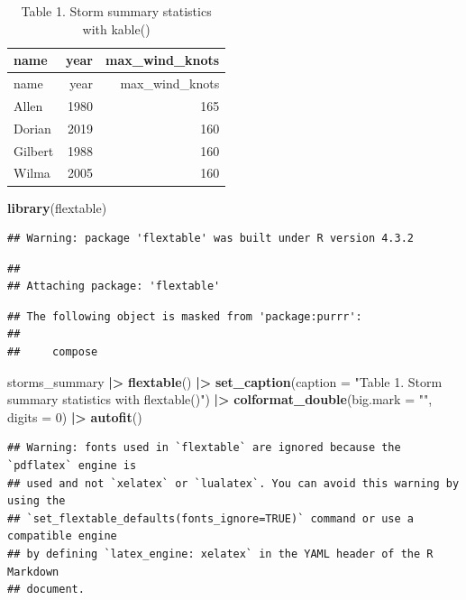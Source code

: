 \documentclass[
]{article}
\newenvironment{Shaded}{\begin{snugshade}}{\end{snugshade}}
\newcommand{\AttributeTok}[1]{\textcolor[rgb]{0.13,0.29,0.53}{#1}}
\newcommand{\DecValTok}[1]{\textcolor[rgb]{0.00,0.00,0.81}{#1}}
\newcommand{\FunctionTok}[1]{\textcolor[rgb]{0.13,0.29,0.53}{\textbf{#1}}}
\newcommand{\NormalTok}[1]{#1}
\newcommand{\SpecialCharTok}[1]{\textcolor[rgb]{0.81,0.36,0.00}{\textbf{#1}}}
\newcommand{\StringTok}[1]{\textcolor[rgb]{0.31,0.60,0.02}{#1}}
\begin{document}
\begin{longtable}[]{@{}lrr@{}}
\caption{Table 1. Storm summary statistics with kable()}\tabularnewline
\toprule\noalign{}
name & year & max\_wind\_knots \\
\midrule\noalign{}
\endfirsthead
\toprule\noalign{}
name & year & max\_wind\_knots \\
\midrule\noalign{}
\endhead
\bottomrule\noalign{}
\endlastfoot
Allen & 1980 & 165 \\
Dorian & 2019 & 160 \\
Gilbert & 1988 & 160 \\
Wilma & 2005 & 160 \\
\end{longtable}

\begin{Shaded}
\begin{Highlighting}[]
\FunctionTok{library}\NormalTok{(flextable)}
\end{Highlighting}
\end{Shaded}

\begin{verbatim}
## Warning: package 'flextable' was built under R version 4.3.2
\end{verbatim}

\begin{verbatim}
## 
## Attaching package: 'flextable'
\end{verbatim}

\begin{verbatim}
## The following object is masked from 'package:purrr':
## 
##     compose
\end{verbatim}

\begin{Shaded}
\begin{Highlighting}[]
\NormalTok{storms\_summary }\SpecialCharTok{|\textgreater{}} 
  \FunctionTok{flextable}\NormalTok{() }\SpecialCharTok{|\textgreater{}} 
  \FunctionTok{set\_caption}\NormalTok{(}\AttributeTok{caption =} \StringTok{"Table 1. Storm summary statistics with flextable()"}\NormalTok{) }\SpecialCharTok{|\textgreater{}} 
  \FunctionTok{colformat\_double}\NormalTok{(}\AttributeTok{big.mark =} \StringTok{""}\NormalTok{, }\AttributeTok{digits =} \DecValTok{0}\NormalTok{) }\SpecialCharTok{|\textgreater{}} 
  \FunctionTok{autofit}\NormalTok{()}
\end{Highlighting}
\end{Shaded}

\begin{verbatim}
## Warning: fonts used in `flextable` are ignored because the `pdflatex` engine is
## used and not `xelatex` or `lualatex`. You can avoid this warning by using the
## `set_flextable_defaults(fonts_ignore=TRUE)` command or use a compatible engine
## by defining `latex_engine: xelatex` in the YAML header of the R Markdown
## document.
\end{verbatim}
\end{document}
